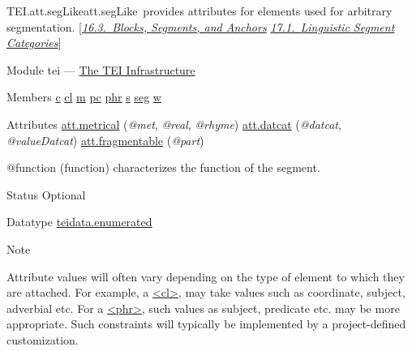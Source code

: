 \begin{reflist}
\item[]\begin{specHead}{TEI.att.segLike}{att.segLike} provides attributes for elements used for arbitrary segmentation. [\textit{\hyperref[SASE]{16.3.\ Blocks, Segments, and Anchors}} \textit{\hyperref[AILC]{17.1.\ Linguistic Segment Categories}}]\end{specHead} 
    \item[{Module}]
  tei — \hyperref[ST]{The TEI Infrastructure}
    \item[{Members}]
  \hyperref[TEI.c]{c} \hyperref[TEI.cl]{cl} \hyperref[TEI.m]{m} \hyperref[TEI.pc]{pc} \hyperref[TEI.phr]{phr} \hyperref[TEI.s]{s} \hyperref[TEI.seg]{seg} \hyperref[TEI.w]{w}
    \item[{Attributes}]
  \hyperref[TEI.att.metrical]{att.metrical} (\textit{@met}, \textit{@real}, \textit{@rhyme}) \hyperref[TEI.att.datcat]{att.datcat} (\textit{@datcat}, \textit{@valueDatcat}) \hyperref[TEI.att.fragmentable]{att.fragmentable} (\textit{@part}) \hfil\\[-10pt]\begin{sansreflist}
    \item[@function]
  (function) characterizes the function of the segment.
\begin{reflist}
    \item[{Status}]
  Optional
    \item[{Datatype}]
  \hyperref[TEI.teidata.enumerated]{teidata.enumerated}
    \item[{Note}]
  \par
Attribute values will often vary depending on the type of element to which they are attached. For example, a \hyperref[TEI.cl]{<cl>}, may take values such as coordinate, subject, adverbial etc. For a \hyperref[TEI.phr]{<phr>}, such values as subject, predicate etc. may be more appropriate. Such constraints will typically be implemented by a project-defined customization.
\end{reflist}  
\end{sansreflist}  
\end{reflist}  
